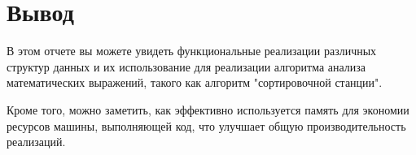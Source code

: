 
\section{Вывод}
В этом отчете вы можете увидеть функциональные реализации различных структур
данных и их использование для реализации алгоритма анализа математических
выражений, такого как алгоритм "сортировочной станции".

Кроме того, можно заметить,
как эффективно используется память для экономии ресурсов машины,
выполняющей код, что улучшает общую производительность реализаций.
